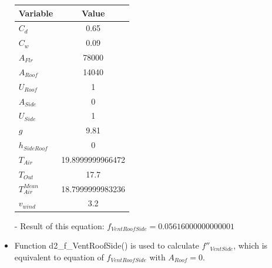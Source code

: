 \documentclass[a4paper]{article}
\begin{document}
\begin{itemize}
        \begin{table}[H]
          \centering
          \begin{tabular}{@{}lS[table-format=5.13]@{}}
            \toprule
            \textbf{Variable}  & \textbf{Value}   \\
            \midrule
            \(C_d\)            & 0.65             \\
            \(C_w\)            & 0.09             \\
            \(A_{Flr}\)        & 78000            \\
            \(A_{Roof}\)       & 14040            \\
            \(U_{Roof}\)       & 1                \\
            \(A_{Side}\)       & 0                \\
            \(U_{Side}\)       & 1                \\
            \(g\)              & 9.81             \\
            \(h_{SideRoof}\)   & 0                \\
            \(T_{Air}\)        & 19.8999999966472 \\
            \(T_{Out}\)        & 17.7             \\
            \(T_{Air}^{Mean}\) & 18.7999999983236 \\
            \(v_{wind}\)       & 3.2              \\
            \bottomrule
          \end{tabular}
        \end{table}

  \item[-] Result of this equation: \(f_{VentRoofSide} = 0.05616000000000001\)

  \item Function d2\_f\_VentRoofSide() is used to calculate \(f''_{VentSide}\), which is equivalent to equation of \(f_{VentRoofSide}\) with \(A_{Roof} = 0\).


\end{itemize}
\end{document}
